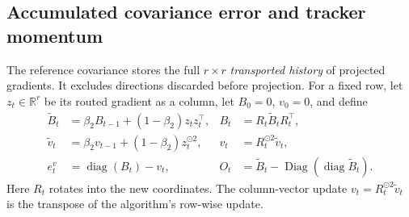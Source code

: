 \subsection{Accumulated covariance error and tracker momentum}
\label{app:moment-error-calculus}
The reference covariance stores the full $r\times r$ \emph{transported
history} of projected gradients. It excludes directions discarded before
projection.
For a fixed row, let $z_t\in\mathbb R^r$ be its routed gradient as a column,
let $B_0=0$, $v_0=0$, and define
\begin{align}
 \widetilde B_t&=\beta_2B_{t-1}+(1-\beta_2)z_tz_t^\top,&
 B_t&=R_t\widetilde B_tR_t^\top,\\
 \widetilde v_t&=\beta_2v_{t-1}+(1-\beta_2)z_t^{\odot2},&
 v_t&=R_t^{\odot2}\widetilde v_t,\\
 e_t^v&=\operatorname{diag}(B_t)-v_t,&
 O_t&=\widetilde B_t-\operatorname{Diag}(\operatorname{diag}\widetilde B_t).
\end{align}
Here $R_t$ rotates into the new coordinates. The column-vector update
$v_t=R_t^{\odot2}\widetilde v_t$ is the transpose of the algorithm's row-wise update.

